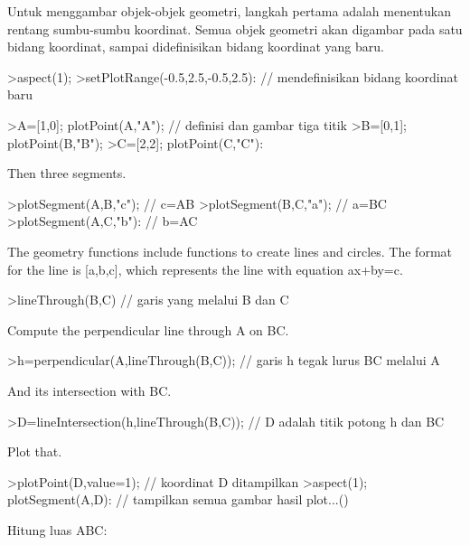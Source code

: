 \documentclass[a4paper,10pt]{article}
\begin{document}
\begin{eulernotebook}
\begin{eulercomment}
\end{eulercomment}
\begin{eulercomment}
Untuk menggambar objek-objek geometri, langkah pertama adalah menentukan rentang sumbu-sumbu
koordinat. Semua objek geometri akan digambar pada satu bidang koordinat, sampai didefinisikan
bidang koordinat yang baru.
\end{eulercomment}
\begin{eulerprompt}
>aspect(1);
>setPlotRange(-0.5,2.5,-0.5,2.5): // mendefinisikan bidang koordinat baru 
\end{eulerprompt}
\begin{eulerprompt}
>A=[1,0]; plotPoint(A,"A"); // definisi dan gambar tiga titik
>B=[0,1]; plotPoint(B,"B");
>C=[2,2]; plotPoint(C,"C"):
\end{eulerprompt}
\begin{eulercomment}
Then three segments.
\end{eulercomment}
\begin{eulerprompt}
>plotSegment(A,B,"c"); // c=AB
>plotSegment(B,C,"a"); // a=BC
>plotSegment(A,C,"b"): // b=AC
\end{eulerprompt}
\begin{eulercomment}
The geometry functions include functions to create lines and circles.
The format for the line is [a,b,c], which represents the line with
equation ax+by=c.
\end{eulercomment}
\begin{eulerprompt}
>lineThrough(B,C) // garis yang melalui B dan C
\end{eulerprompt}
\begin{euleroutput}
  [-1,  2,  2]
\end{euleroutput}
\begin{eulercomment}
Compute the perpendicular line through A on BC.
\end{eulercomment}
\begin{eulerprompt}
>h=perpendicular(A,lineThrough(B,C)); // garis h tegak lurus BC melalui A
\end{eulerprompt}
\begin{eulercomment}
And its intersection with BC.
\end{eulercomment}
\begin{eulerprompt}
>D=lineIntersection(h,lineThrough(B,C)); // D adalah titik potong h dan BC
\end{eulerprompt}
\begin{eulercomment}
Plot that.
\end{eulercomment}
\begin{eulerprompt}
>plotPoint(D,value=1); // koordinat D ditampilkan
>aspect(1); plotSegment(A,D): // tampilkan semua gambar hasil plot...()
\end{eulerprompt}
\begin{eulercomment}
Hitung luas ABC:


\end{eulercomment}
\end{eulernotebook}
\end{document}
